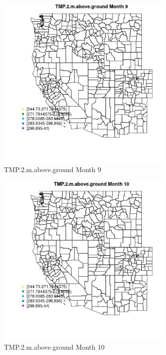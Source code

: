 \begin{figure} 
\centering  
\includegraphics[width=0.77\textwidth]{Code_Outputs/Report_ML_input_PM25_Step4_part_e_de_duplicated_aveswNAs_MapObsMo9TMP2maboveground.jpg} 
\caption{\label{fig:Report_ML_input_PM25_Step4_part_e_de_duplicated_aveswNAsMapObsMo9TMP2maboveground}TMP.2.m.above.ground Month 9} 
\end{figure} 
 

\begin{figure} 
\centering  
\includegraphics[width=0.77\textwidth]{Code_Outputs/Report_ML_input_PM25_Step4_part_e_de_duplicated_aveswNAs_MapObsMo10TMP2maboveground.jpg} 
\caption{\label{fig:Report_ML_input_PM25_Step4_part_e_de_duplicated_aveswNAsMapObsMo10TMP2maboveground}TMP.2.m.above.ground Month 10} 
\end{figure} 
 

